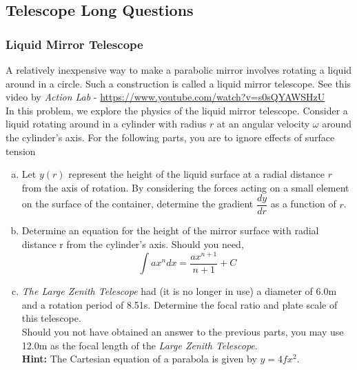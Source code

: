 \documentclass[a4paper,12pt]{extarticle}
\begin{document}
\clearpage
\subsection{Telescope Long Questions}

\subsubsection{Liquid Mirror Telescope}

A relatively inexpensive way to make a parabolic mirror involves rotating a liquid around in a circle.
Such a construction is called a liquid mirror telescope. See this video by \textit{Action Lab} - \url{https://www.youtube.com/watch?v=s0sQYAWSHzU}\\

In this problem, we explore the physics of the liquid mirror telescope. Consider a liquid rotating around in a cylinder with radius $r$ at an angular velocity $\omega$ around the cylinder’s axis. For the following parts, you are to ignore effects of surface tension
\begin{enumerate}[a.]
	\item Let $y(r)$ represent the height of the liquid surface at a radial distance $r$ from the axis of rotation. By considering the forces acting on a small element on the surface of the container, determine the gradient $\dfrac{dy}{dr}$ as a function of $r$.
	\item Determine an equation for the height of the mirror surface with radial distance r from the cylinder's axis. Should you need, $$\int ax^n dx=\frac{ax^{n+1}}{n+1}+C$$
	\item \textit{The Large Zenith Telescope} had (it is no longer in use) a diameter of $6.0$m and a rotation period of 8.51s. Determine the focal ratio and plate scale of this telescope.\\
	Should you not have obtained an answer to the previous parts, you may use 12.0m as the focal
	length of the \textit{Large Zenith Telescope}.\\
	\textbf{Hint:} The Cartesian equation of a parabola is given by $y = 4fx^2$.
\end{enumerate}
\end{document}
